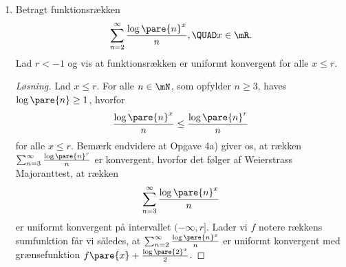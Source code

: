 \begin{opg}
\begin{enumerate}
\begin{proof}
\begin{indent}
    Hvis $p > 1$, så findes $N\in\mN$, så for alle $n\in\mN$, der opfylder $n\geq N$, haves $\log\pare{n}^r\leq n^{\frac{p-1}{2}}$, hvilket giver
    $$ b_n = \frac{\log\pare{n}^r}{n^p} \leq \frac{n^{\frac{p-1}{2}}}{n^p}
        = \frac{1}{n^{\frac{p+1}{2}}}, $$ 
    hvorfor det følger af sammenligningstesten og MC 2.23, at den angivne række er konvergent.
    
    \underline{Tilfælde 2}: Antag $r\leq 0$. Lad $f\colon (0,\infty)\to\mR$ være givet ved $f\pare{x} = \frac{\log\pare{x}^r}{x^p}$. Da haves
    $$ f'\pare{x} = \frac{r\log\pare{x}^{r-1} - p\log\pare{x}^r}{x^{p+1}}
        \leq 0, $$
    hvorfor det følger at $\seq b$ er en aftagende følge af positive elementer. Det følger således af MC 2.22, at den angivne række er konvergent, hvis og kun hvis
    $$ \sum_{k=1}^\infty 2^ka_{2^k}
        = \sum_{k=1}^\infty 2^k\frac{\log\pare{2^k}^r}{2^{kp}}
        = \sum_{k=1}^\infty \frac{\log\pare{2^k}^r}{2^{k\pare{p-1}}}
        = \sum_{k=1}^\infty \frac{\pare{k\log 2}^r}{2^{k\pare{p-1}}} $$
    Lad nu $\seqI{b'}{k}$ være givet ved $b_k' = \frac{\pare{k\log 2}^r}{2^{k\pare{p-1}}}$ og bemærk
    $$ \sqrt[k]{b_k'} = \sqrt[k]{\frac{\pare{k\log 2}^r}{2^{k\pare{p-1}}}}
        = \frac{\pare{k^{1/k}\log \pare{2}^{1/k}}^r}{2^{p-1}}
        \to \frac{1}{2^{p-1}}, $$
    hvorfor det følger af rodtesten, at den angivne række er konvergent for $p > 1$ og divergent for $p < 1$. Tilfældet $p = 1$ er dækket i Opgave 4a).
    \end{indent}
    \end{proof}
    \fi
    
    \item Betragt funktionsrækken
    $$ \sum_{n=2}^\infty \frac{\log\pare{n}^x}{n}, \QUAD x\in\mR. $$
    Lad $r<-1$ og vis at funktionsrækken er uniformt konvergent for alle $x \leq r$. 
    
    \begin{proof}[Løsning]
    Lad $x\leq r$. For alle $n\in\mN$, som opfylder $n\geq 3$, haves $\log\pare{n}\geq 1$, hvorfor
    $$ \frac{\log\pare{n}^x}{n} \leq \frac{\log\pare{n}^r}{n} $$
    for alle $x\leq r$. Bemærk endvidere at Opgave 4a) giver os, at rækken $\sum_{n=3}^\infty \frac{\log\pare{n}^r}{n}$ er konvergent, hvorfor det følger af Weierstrass Majoranttest, at rækken
    $$ \sum_{n=3}^\infty \frac{\log\pare{n}^x}{n} $$
    er uniformt konvergent på intervallet $(-\infty,r]$. Lader vi $f$ notere rækkens sumfunktion får vi således, at $\sum_{n=2}^\infty \frac{\log\pare{n}^x}{n}$ er uniformt konvergent med grænsefunktion $f\pare{x} + \frac{\log\pare{2}^x}{2}$.
    \end{proof}
\end{enumerate}
\end{opg}